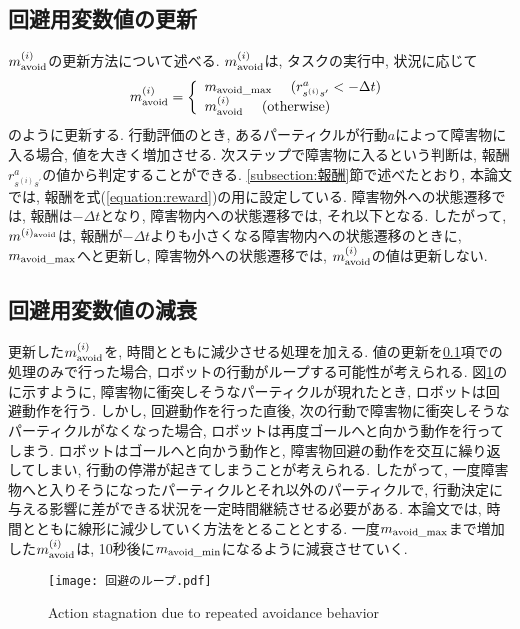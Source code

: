 \subsection{回避用変数値の更新} \label{subsection:回避用変数値の更新}
$m^{(i)}_{\rm avoid}$の更新方法について述べる. 
$m^{(i)}_{\rm avoid}$は, タスクの実行中, 状況に応じて
\begin{equation}
\label{equation:reward}
  m^{(i)}_{\rm avoid} =
  \left\{
    \begin{array}{l}
      m_{\rm avoid\_max} \ \ \ \ (r^{a}_{s^{(i)}s^{\prime}} < - \Delta t) \\
      m^{(i)}_{\rm avoid} \ \ \ \ ({\rm otherwise})
    \end{array}
  \right.
\end{equation}
のように更新する. 
行動評価のとき, あるパーティクルが行動$a$によって障害物に入る場合, 値を大きく増加させる. 
次ステップで障害物に入るという判断は, 報酬$r^{a}_{s^{(i)}s^{\prime}}$の値から判定することができる. 
\ref{subsection:報酬}節で述べたとおり, 本論文では, 報酬を式(\ref{equation:reward})の用に設定している. 
障害物外への状態遷移では, 報酬は$-\Delta t$となり, 障害物内への状態遷移では, それ以下となる. 
したがって, $m^{(i)_{\rm avoid}}$は, 
報酬が$-\Delta t$よりも小さくなる障害物内への状態遷移のときに, $m_{\rm avoid\_max}$へと更新し, 
障害物外への状態遷移では, $m^{(i)}_{\rm avoid}$の値は更新しない. 

\subsection{回避用変数値の減衰}
更新した$m^{(i)}_{\rm avoid}$を, 時間とともに減少させる処理を加える. 
値の更新を\ref{subsection:回避用変数値の更新}項での処理のみで行った場合, ロボットの行動がループする可能性が考えられる. 
図\ref{fig:回避のループ}のに示すように, 障害物に衝突しそうなパーティクルが現れたとき, ロボットは回避動作を行う. 
しかし, 回避動作を行った直後, 次の行動で障害物に衝突しそうなパーティクルがなくなった場合, ロボットは再度ゴールへと向かう動作を行ってしまう. 
ロボットはゴールへと向かう動作と, 障害物回避の動作を交互に繰り返してしまい, 行動の停滞が起きてしまうことが考えられる. 
したがって, 一度障害物へと入りそうになったパーティクルとそれ以外のパーティクルで, 行動決定に与える影響に差ができる状況を一定時間継続させる必要がある. 
本論文では, 時間とともに線形に減少していく方法をとることとする. 
一度$m_{\rm avoid\_max}$まで増加した$m^{(i)}_{\rm avoid}$は, 10秒後に$m_{\rm avoid\_min}$になるように減衰させていく. 

\begin{figure}[H]
  \begin{center}
    \texttt{[image: 回避のループ.pdf]}
    \caption{Action stagnation due to repeated avoidance behavior}
    \label{fig:回避のループ}
  \end{center}
\end{figure}
